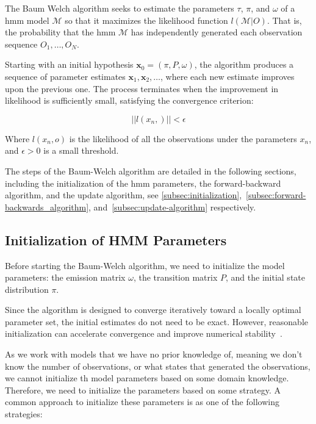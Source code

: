 The Baum Welch algorithm seeks to estimate the parameters $\tau$, $\pi$, and $\omega$ of a \gls{hmm} model $\mathcal{M}$ so that it maximizes the likelihood function $l(\mathcal{M} | O)$.
That is, the probability that the \gls{hmm} $\mathcal{M}$ has independently generated each observation sequence $O_1, \ldots, O_N$.

Starting with an initial hypothesis $\textbf{x}_0 = (\pi, P, \omega)$, the algorithm produces a sequence of parameter estimates $\textbf{x}_1, \textbf{x}_2, \ldots$, where each new estimate improves upon the previous one.
The process terminates when the improvement in likelihood is sufficiently small, satisfying the convergence criterion:

\[
    ||l(x_n, )|| < \epsilon
\]

Where $l(x_n, o)$ is the likelihood of all the observations under the parameters $x_n$, and $\epsilon > 0$ is a small threshold.

The steps of the Baum-Welch algorithm are detailed in the following sections, including the initialization of the \gls{hmm} parameters, the forward-backward algorithm, and the update algorithm, see \autoref{subsec:initialization},~\ref{subsec:forward-backwards_algorithm}, and~\ref{subsec:update-algorithm} respectively.

\subsection{Initialization of HMM Parameters}\label{subsec:initialization}
Before starting the Baum-Welch algorithm, we need to initialize the model parameters: the emission matrix $\omega$, the transition matrix $P$, and the initial state distribution $\pi$.

Since the algorithm is designed to converge iteratively toward a locally optimal parameter set, the initial estimates do not need to be exact.
However, reasonable initialization can accelerate convergence and improve numerical stability~\cite{benyacoub2015initial}.

As we work with models that we have no prior knowledge of, meaning we don't know the number of observations, or what states that generated the observations, we cannot initialize th model parameters based on some domain knowledge.
Therefore, we need to initialize the parameters based on some strategy.
A common approach to initialize these parameters is as one of the following strategies:

